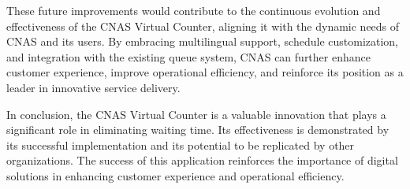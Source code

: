 These future improvements would contribute to the continuous evolution and effectiveness of the CNAS Virtual Counter, aligning it with the dynamic needs of CNAS and its users. By embracing multilingual support, schedule customization, and integration with the existing queue system, CNAS can further enhance customer experience, improve operational efficiency, and reinforce its position as a leader in innovative service delivery.

In conclusion, the CNAS Virtual Counter is a valuable innovation that plays a significant role in eliminating waiting time. Its effectiveness is demonstrated by its successful implementation and its potential to be replicated by other organizations. The success of this application reinforces the importance of digital solutions in enhancing customer experience and operational efficiency.
